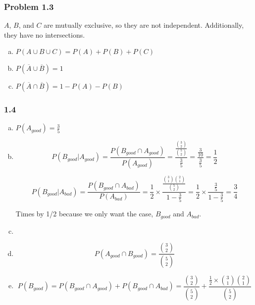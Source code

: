 \documentclass{report}
\begin{document}
\subsubsection*{Problem 1.3}

$A$, $B$, and $C$ are mutually exclusive, so they are not independent. Additionally, they have no intersections.


\begin{enumerate}[(a)]

\item $P(A \cup B \cup C) = P(A) + P(B) + P(C)$

\item $P(\overline{A} \cup \overline{B}) = 1$

\item $P(\overline{A} \cap \overline{B}) = 1 - P(A) - P(B)$ 


\end{enumerate}

\subsubsection*{1.4}

\begin{enumerate}[(a)]

\item $P(A_{good}) = \frac{3}{5}$

\item $$P(B_{good} | A_{good}) = \frac{P(B_{good} \cap A_{good})}{P(A_{good})} = \frac{\frac{{3 \choose 2}}{{5 \choose 2}}}{\frac{3}{5}} = \frac{\frac{3}{10}}{\frac{3}{5}} = \frac{1}{2}$$

$$P(B_{good} | A_{bad}) = \frac{P(B_{good} \cap A_{bad})}{P(A_{bad})} = \frac{1}{2} \times \frac{\frac{{3 \choose 1}{2 \choose 1}}{{5 \choose 2}}}{1 - \frac{3}{5}} = \frac{1}{2} \times \frac{\frac{3}{5}}{1 - \frac{3}{5}} = \frac{3}{4}$$

Times by 1/2 because we only want the case, $B_{good}$ and $A_{bad}$.

\item 

\item $$P(A_{good} \cap B_{good}) = \frac{{3 \choose 2}}{{5 \choose 2}}$$

\item $$P(B_{good}) = P(B_{good} \cap A_{good}) + P(B_{good} \cap A_{bad}) = \frac{{3 \choose 2}}{{5 \choose 2}} +  \frac{\frac{1}{2} \times {3 \choose 1}{2 \choose 1}}{{5 \choose 2}}$$

\end{enumerate}
\end{document}
